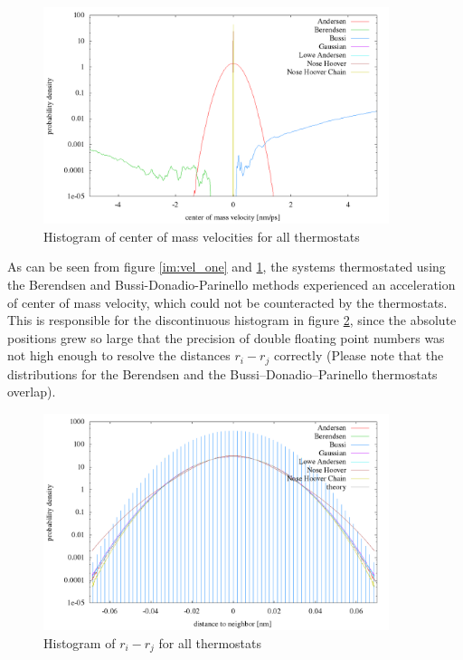 \begin{figure}[H]
\centering
    \includegraphics[width=0.9\textwidth]{./graphics/Histogramm_schwerVel_one_T=20_p=64.png}
    \caption{Histogram of center of mass velocities for all thermostats}
    \label{im:schwerVel_one} 
\end{figure} 
As can be seen from figure \ref{im:vel_one} and \ref{im:schwerVel_one}, the systems thermostated using the Berendsen and Bussi-Donadio-Parinello methods experienced an acceleration of center of mass velocity, which could not be counteracted by the thermostats. This is responsible for the discontinuous histogram in figure \ref{im:relPos_one}, since the absolute positions grew so large that the precision of double floating point numbers was not high enough to resolve the distances $r_i - r_j$ correctly (Please note that the distributions for the Berendsen and the Bussi--Donadio--Parinello  thermostats overlap).

\begin{figure}[H]
\centering
\includegraphics[width=0.9\textwidth]{./graphics/Histogramm_relPos_one_T=20_p=64.png}
\caption{Histogram of $r_i - r_j$ for all thermostats}
\label{im:relPos_one}
\end{figure} 

